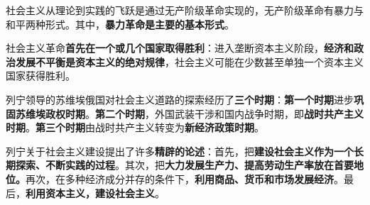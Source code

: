社会主义从理论到实践的飞跃是通过无产阶级革命实现的，无产阶级革命有暴力与和平两种形式。其中，{\textbf{暴力革命}}\textbf{{是主要的基本形式}}。

社会主义革命{\textbf{首先在一个或几个国家取得胜利}}{：进入垄断资本主义阶段，}{\textbf{经济和政治发展不平衡是资本主义的绝对规律}}{，社会主义可能在少数甚至单独一个资本主义国家获得胜利。}

列宁领导的苏维埃俄国对社会主义道路的探索经历了{\textbf{三个时期}}：{{\textbf{第一个时期}}}{}进步{\textbf{巩固苏维埃政权时期}}。{{\textbf{第二个时期}}}{}，外国武装干涉和国内战争时期，即{\textbf{战时共产主义时期}}。{{\textbf{第三个时期}}}{}由战时共产主义转变为\textbf{{新经济政策时期}}。

{列宁关于社会主义建设提出了许多{\textbf{精辟的论述}}：}首先，把{\textbf{建设社会主义作为一个长期探索、不断实践的{\textbf{过程}}}}。其次，把{\textbf{大力发展生产力、提高劳动生产率放在首要地位}}\textbf{。}再次，在多种经济成分并存的条件下，\textbf{{利用商品、货币和市场发展经济}}。最后，{\textbf{利用资本主义，建设社会主义}}{。}
